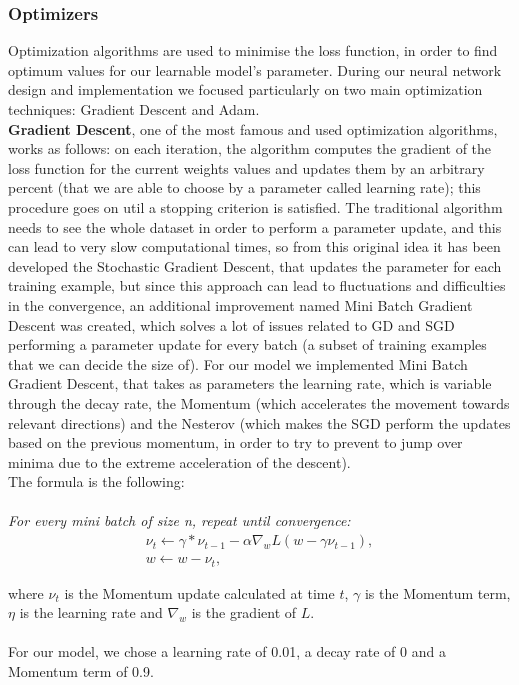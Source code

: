 \documentclass[12pt]{article}
\begin{document}
\subsubsection{Optimizers}
Optimization algorithms are used to minimise the loss function, in order to find optimum values for our learnable model’s parameter. During our neural network design and implementation we focused particularly on two main optimization techniques: Gradient Descent and Adam. \\
\textbf{Gradient Descent}, one of the most famous and used optimization algorithms, works as follows: on each iteration, the algorithm computes the gradient of the loss function for the current weights values and updates them by an arbitrary percent (that we are able to choose by a parameter called learning rate); this procedure goes on util a stopping criterion is satisfied. 
The traditional algorithm needs to see the whole dataset in order to perform a parameter update, and this can lead to very slow computational times, so from this original idea it has been developed the Stochastic Gradient Descent, that updates the parameter for each training example, but since this approach can lead to fluctuations and difficulties in the convergence, an additional improvement named Mini Batch Gradient Descent was created, which solves a lot of issues related to GD and SGD performing a parameter update for every batch (a subset of training examples that we can decide the size of). 
For our model we implemented Mini Batch Gradient Descent, that takes as parameters the learning rate, which is variable through the decay rate, the Momentum (which accelerates the movement towards relevant directions) and the Nesterov (which makes the SGD perform the updates based on the previous momentum, in order to try to prevent to jump over minima due to the extreme acceleration of the descent).  \\
The formula is the following: \\ \\

\textit{For every mini batch of size n, repeat until convergence:} 
\begin{align*}
\nu_{t}  \gets \gamma  *  \nu_{t-1} - \alpha \nabla_{w} L(w - \gamma\nu_{t-1}), \\
w \gets  w - \nu_{t},
\end{align*}


where $\nu_{t}$ is the Momentum update calculated at time $t$, $\gamma$ is the Momentum term, $\eta$ is the learning rate and $\nabla_{w}$ is the gradient of $L$.   \\ \\
For our model, we chose a learning rate of 0.01, a decay rate of 0 and a Momentum term of 0.9. \\
\end{document}
